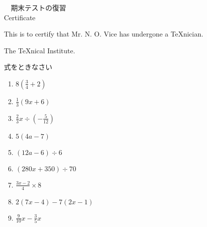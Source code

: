 \documentclass[fleqn]{jsarticle}
\begin{document}
\begin{center}
　期末テストの復習\\[.75cm] Certificate
\end{center}
\noindent This is to certify that Mr. N. O. Vice has undergone a \TeX nician.
\begin{flushright}
  The \TeX nical Institute.
\end{flushright}
  式をときなさい
\begin{multicols}{3}
\begin{enumerate}
  \item $\displaystyle8\left(\frac{3}{4} + 2\right)$ \\[.75cm]
  \item $\displaystyle \frac{1}{3}\left(9x +6\right)$\\[.75cm]
  \item $\displaystyle \frac{2}{3}x \div \left( - \frac{5}{12} \right)$ 
  \item $\displaystyle 5\left( 4a -7\right)$ \\[.75cm]
  \item $\displaystyle \left(12a -6 \right) \div 6 $ \\[.75cm]
  \item $\displaystyle \left( 280x + 350 \right) \div 70$  
  \item $\displaystyle \frac{3x-2}{4} \times 8$ \\[.75cm]
  \item $\displaystyle 2(7x -4) -7(2x -1)$ \\[.75cm] 
  \item $\displaystyle \frac{9}{10}x -\frac{3}{5}x $
\end{enumerate}
\end{multicols}
\end{document}
